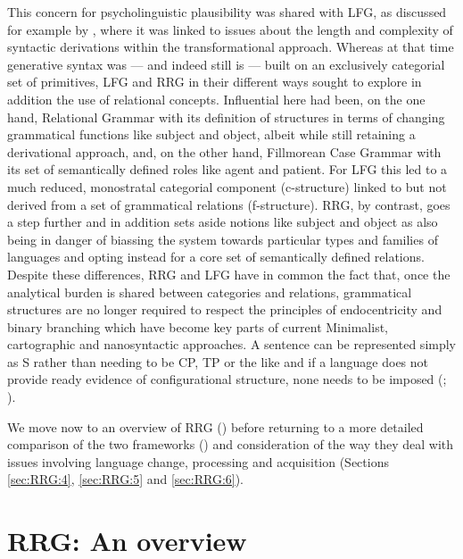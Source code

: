\documentclass[output=paper,hidelinks]{langscibook}
\begin{document}
This concern for psycholinguistic plausibility was shared with LFG, as discussed for example by \citet{bresnan1982introduction}, where it was linked to issues about the length and complexity of syntactic derivations within the transformational approach. Whereas at that time generative syntax was  ---  and indeed still is  ---  built on an exclusively categorial set of primitives, LFG and RRG in their different ways sought to explore in addition the use of relational concepts. Influential here had been, on the one hand, Relational Grammar with its definition of structures in terms of changing grammatical functions like subject and object, albeit while still retaining a derivational approach, and, on the other hand, Fillmorean Case Grammar with its set of semantically defined roles like agent and patient. For LFG this led to a much reduced, monostratal categorial component (c-structure) linked to but not derived from a set of grammatical relations (f-structure). RRG, by contrast, goes a step further and in addition sets aside notions like subject and object as also being in danger of biassing the system towards particular types and families of languages and opting instead for a core set of semantically defined relations. Despite these differences, RRG and LFG have in common the fact that, once the analytical burden is shared between categories and relations, grammatical structures are no longer required to respect the principles of endocentricity and binary branching which have become key parts of current Minimalist, cartographic and nanosyntactic approaches. A sentence can be represented simply as S rather than needing to be CP, TP or the like and if a language does not provide ready evidence of configurational structure, none needs to be imposed (\citealt{AustBres96}; \citealt[Chapter~2]{VanValin1997}).

We move now to an overview of RRG () before returning to a more detailed comparison of the two frameworks () and consideration of the way they deal with issues involving language change, processing and acquisition (Sections \ref{sec:RRG:4}, \ref{sec:RRG:5} and \ref{sec:RRG:6}).

\section{RRG: An overview}
\label{sec:RRG:2}
\end{document}
